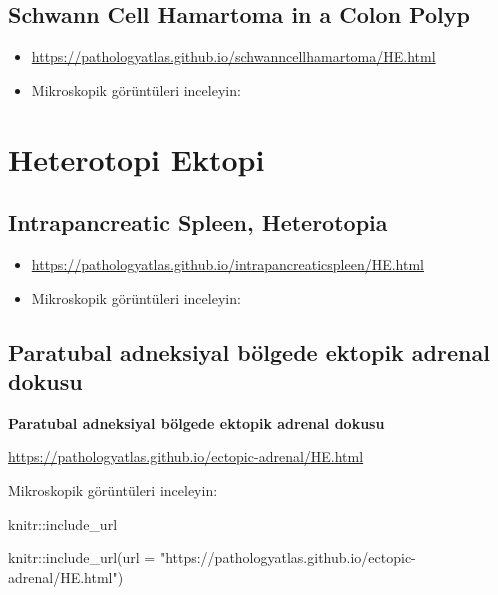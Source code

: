 \documentclass[
  letterpaper,
  DIV=11,
  numbers=noendperiod]{scrreprt}
\newenvironment{Shaded}{}{}
\newcommand{\AttributeTok}[1]{\textcolor[rgb]{0.84,0.23,0.29}{#1}}
\newcommand{\FunctionTok}[1]{\textcolor[rgb]{0.44,0.26,0.76}{#1}}
\newcommand{\NormalTok}[1]{\textcolor[rgb]{0.14,0.16,0.18}{#1}}
\newcommand{\SpecialCharTok}[1]{\textcolor[rgb]{0.00,0.36,0.77}{#1}}
\newcommand{\StringTok}[1]{\textcolor[rgb]{0.01,0.18,0.38}{#1}}
\begin{document}
\hypertarget{schwann-cell-hamartoma-in-a-colon-polyp}{%
\section{Schwann Cell Hamartoma in a Colon
Polyp}\label{schwann-cell-hamartoma-in-a-colon-polyp}}

\begin{itemize}
\item
  \url{https://pathologyatlas.github.io/schwanncellhamartoma/HE.html}
\item
  Mikroskopik görüntüleri inceleyin:
\end{itemize}

\hypertarget{heterotopi-ektopi}{%
\chapter{Heterotopi Ektopi}\label{heterotopi-ektopi}}

\hypertarget{intrapancreatic-spleen-heterotopia}{%
\section{Intrapancreatic Spleen,
Heterotopia}\label{intrapancreatic-spleen-heterotopia}}

\begin{itemize}
\item
  \url{https://pathologyatlas.github.io/intrapancreaticspleen/HE.html}
\item
  Mikroskopik görüntüleri inceleyin:
\end{itemize}

\hypertarget{paratubal-adneksiyal-buxf6lgede-ektopik-adrenal-dokusu}{%
\section{Paratubal adneksiyal bölgede ektopik adrenal
dokusu}\label{paratubal-adneksiyal-buxf6lgede-ektopik-adrenal-dokusu}}

\textbf{Paratubal adneksiyal bölgede ektopik adrenal dokusu}

\url{https://pathologyatlas.github.io/ectopic-adrenal/HE.html}

Mikroskopik görüntüleri inceleyin:

knitr::include\_url

\begin{Shaded}
\begin{Highlighting}[]
\NormalTok{knitr}\SpecialCharTok{::}\FunctionTok{include\_url}\NormalTok{(}\AttributeTok{url =} \StringTok{"https://pathologyatlas.github.io/ectopic{-}adrenal/HE.html"}\NormalTok{)}
\end{Highlighting}
\end{Shaded}
\end{document}
